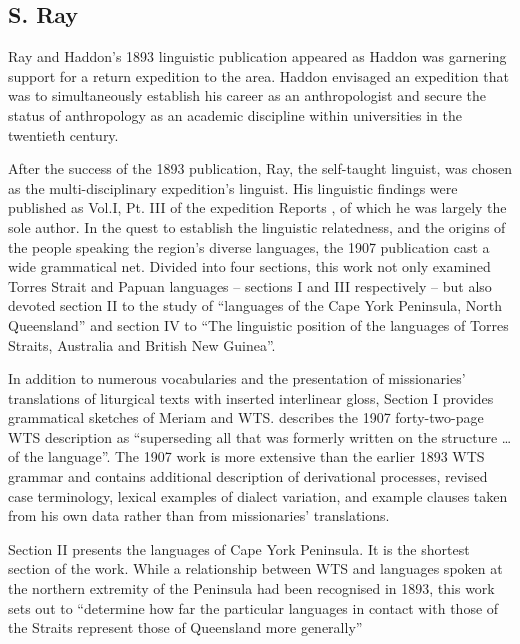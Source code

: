 \subsection{S. Ray \citeyearpar{ray_linguistics_1907}}
\label{sec:key:10.2.2}\label{bkm:Ref339464046}

Ray and Haddon’s 1893 linguistic publication appeared as Haddon was garnering support for a return expedition to the area. Haddon envisaged an expedition that was to simultaneously establish his career as an anthropologist and secure the status of anthropology as an academic discipline within universities in the twentieth century.

After the success of the 1893 publication, Ray, the self-taught linguist, was chosen as the multi-disciplinary expedition’s linguist. His linguistic findings were published as Vol.I, Pt. III of the expedition Reports \citeyearpar{ray_linguistics_1907}, of which he was largely the sole author. In the quest to establish the linguistic relatedness, and the origins of the people speaking the region’s diverse languages, the 1907 publication cast a wide grammatical net. Divided into four sections, this work not only examined Torres Strait and Papuan languages – sections I and III respectively – but also devoted section II to the study of “languages of the Cape York Peninsula, North Queensland” and section IV to “The linguistic position of the languages of Torres Straits, Australia and British New Guinea”.

In addition to numerous vocabularies and the presentation of missionaries' translations of liturgical texts with inserted interlinear gloss, Section I provides grammatical sketches of Meriam and WTS. \citet[5]{ray_linguistics_1907} describes the 1907 forty-two-page WTS description as “superseding all that was formerly written on the structure … of the language”. The 1907 work is more extensive than the earlier 1893 WTS grammar and contains additional description of derivational processes, revised case terminology, lexical examples of dialect variation, and example clauses taken from his own data rather than from missionaries' translations.

Section II presents the languages of Cape York Peninsula. It is the shortest section of the work. While a relationship between WTS and languages spoken at the northern extremity of the Peninsula had been recognised in 1893, this work sets out to “determine how far the particular languages in contact with those of the Straits represent those of Queensland more generally” \citep[264]{ray_linguistics_1907}

